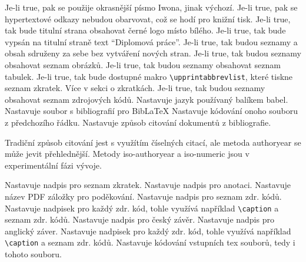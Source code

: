 \documentclass[a4paper,12pt]{article}
\begin{document}
\begin{optionlist}
Je-li true, pak se použije okrasnější písmo Iwona, jinak výchozí.
Je-li true, pak se hypertextové odkazy nebudou obarvovat, což se hodí pro knižní tisk.
Je-li true, tak bude titulní strana obsahovat černé logo místo bílého.
Je-li true, tak bude vypsán na titulní straně text \enquote{Diplomová práce}.
Je-li true, tak budou seznamy a obsah sdruženy za sebe bez vytváření nových stran. 
Je-li true, tak budou seznamy obsahovat seznam obrázků.
Je-li true, tak budou seznamy obsahovat seznam tabulek.
Je-li true, tak bude dostupné makro \verb|\upprintabbrevlist|, které tiskne seznam zkratek. Více v sekci o zkratkách.
Je-li true, tak budou seznamy obsahovat seznam zdrojových kódů. 
Nastavuje jazyk používaný balíkem babel. 
Nastavuje soubor s bibliografií pro Bib\LaTeX  
{}
Nastavuje kódování onoho souboru z předchozího řádku. 
Nastavuje způsob citování dokumentů z bibliografie.

Tradiční způsob citování jest s využítím číselných citací, ale metoda authoryear se může jevit přehlednější. Metody iso-authoryear a iso-numeric jsou v experimentální fázi vývoje.

Nastavuje nadpis pro seznam zkratek. 
Nastavuje nadpis pro anotaci.
Nastavuje název PDF záložky pro poděkování.
Nastavuje nadpis pro seznam zdr. kódů.
Nastavuje nadpisek pro každý zdr. kód, tohle využívá například \verb|\caption| a seznam zdr. kódů. 
Nastavuje nadpis pro český závěr.
Nastavuje nadpis pro anglický záver.
Nastavuje nadpisek pro každý zdr. kód, tohle využívá například \verb|\caption| a seznam zdr. kódů. 
Nastavuje kódování vstupních tex souborů, tedy i tohoto souboru. 
\end{optionlist}
\end{document}
